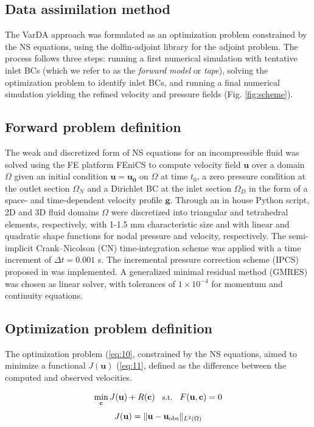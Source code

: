 \subsection*{Data assimilation method}
The VarDA approach was formulated as an optimization problem constrained by the NS equations, using the dolfin-adjoint library for the adjoint problem. The process follows three steps: running a first numerical simulation with tentative inlet BCs (which we refer to as the \emph{forward model} or \emph{tape}), solving the optimization problem to identify inlet BCs, and running a final numerical simulation yielding the refined velocity and pressure fields (Fig. \ref{fig:scheme}).

\subsection*{Forward problem definition}
The weak and discretized form of NS equations for an incompressible fluid \citep{Stokes2009} was solved using the FE platform FEniCS \citep{Alnaes2015} to compute velocity field $\mathbf{u}$ over a domain $\Omega$ given an initial condition \(\mathbf{u}=\mathbf{u_0}\) on $\Omega$ at time $t_0$, a zero pressure condition at the outlet section $\Omega_N$ and a Dirichlet BC at the inlet section $\Omega_D$ in the form of a space- and time-dependent velocity profile $\mathbf{g}$. Through an in house Python script, 2D and 3D fluid domains $\Omega$ were discretized into triangular and tetrahedral elements, respectively, with 1-1.5 mm characteristic size and with linear and quadratic shape functions for nodal pressure and velocity, respectively. The semi-implicit Crank--Nicolson (CN) time-integration scheme was applied with a time increment of $\Delta t = 0.001$ s. The incremental pressure correction scheme (IPCS) proposed in \citep{Goda1979} was implemented. A generalized minimal residual method (GMRES) was chosen as linear solver, with tolerances of $1 \times 10^{-4}$ for momentum and continuity equations.

\subsection*{Optimization problem definition}

The optimization problem (\cref{eq:10}, constrained by the NS equations, aimed to minimize a functional $J(\mathbf{u})$ (\cref{eq:11}, defined as the difference between the computed and observed velocities. 

\begin{equation}
\small
\min_{\mathbf{c}} J(\mathbf{u}) + R(\mathbf{c}) \quad \text{s.t.} \quad F(\mathbf{u}, \mathbf{c}) = 0
\label{eq:10}
\end{equation}
\begin{equation}
\small
    J(\mathbf{u}) = \| \mathbf{u} - \mathbf{u}_{\text{obs}} \|_{L^2(\Omega)}
    \label{eq:11}
\end{equation}

